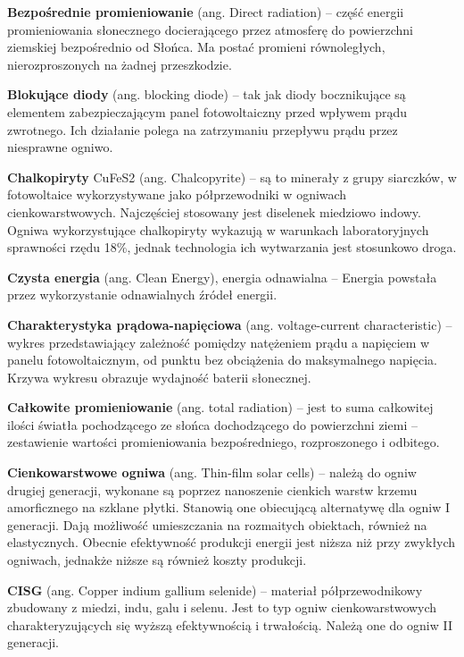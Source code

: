\documentclass[12pt,a4paper]{article}
\begin{document}
\textbf{Bezpośrednie promieniowanie} (ang. Direct radiation) – część energii promieniowania słonecznego docierającego przez atmosferę do powierzchni ziemskiej bezpośrednio od Słońca. Ma postać promieni równoległych, nierozproszonych na żadnej przeszkodzie.

\textbf{Blokujące diody} (ang. blocking diode) – tak jak diody bocznikujące są elementem zabezpieczającym panel fotowoltaiczny przed wpływem prądu zwrotnego. Ich działanie polega na zatrzymaniu przepływu prądu przez niesprawne ogniwo.


\textbf{Chalkopiryty} CuFeS2 (ang. Chalcopyrite) – są to minerały z grupy siarczków, w fotowoltaice wykorzystywane jako półprzewodniki w ogniwach cienkowarstwowych. Najczęściej stosowany jest diselenek miedziowo indowy. Ogniwa wykorzystujące chalkopiryty wykazują w warunkach laboratoryjnych sprawności rzędu 18\%, jednak technologia ich wytwarzania jest stosunkowo droga.

\textbf{Czysta energia} (ang. Clean Energy), energia odnawialna – Energia powstała przez wykorzystanie odnawialnych źródeł energii.

\textbf{Charakterystyka prądowa-napięciowa} (ang. voltage-current characteristic) – wykres przedstawiający zależność pomiędzy natężeniem prądu a napięciem w panelu fotowoltaicznym, od punktu bez obciążenia do maksymalnego napięcia. Krzywa wykresu obrazuje wydajność baterii słonecznej.

\textbf{Całkowite promieniowanie} (ang. total radiation) – jest to suma całkowitej ilości światła pochodzącego ze słońca dochodzącego do powierzchni ziemi – zestawienie wartości promieniowania bezpośredniego, rozproszonego i odbitego.

\textbf{Cienkowarstwowe ogniwa} (ang. Thin-film solar cells) – należą do ogniw drugiej generacji, wykonane są poprzez nanoszenie cienkich warstw krzemu amorficznego na szklane płytki. Stanowią one obiecującą alternatywę dla ogniw I generacji. Dają możliwość umieszczania na rozmaitych obiektach, również na elastycznych. Obecnie efektywność produkcji energii jest niższa niż przy zwykłych ogniwach, jednakże niższe są również koszty produkcji.

\textbf{CISG} (ang. Copper indium gallium selenide) – materiał półprzewodnikowy zbudowany z miedzi, indu, galu i selenu. Jest to typ ogniw cienkowarstwowych charakteryzujących się wyższą efektywnością i trwałością. Należą one do ogniw II generacji.
\end{document}
